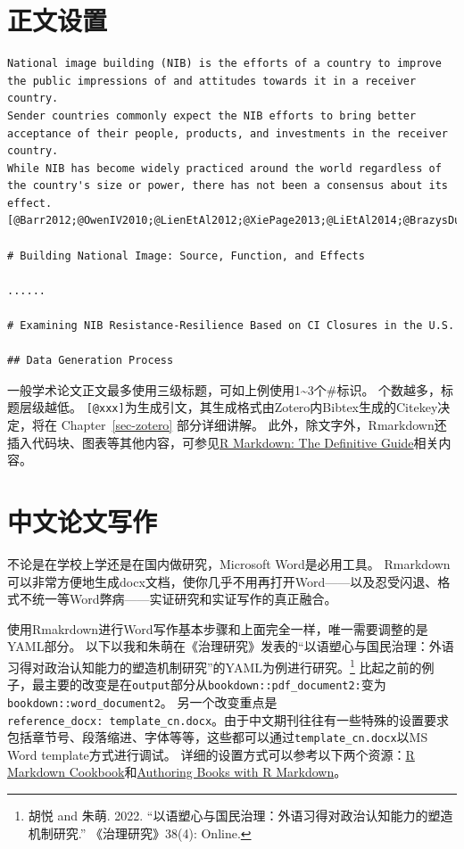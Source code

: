 \documentclass[
  letterpaper,
  DIV=11,
  numbers=noendperiod,
  oneside]{scrreprt}
\begin{document}
\hypertarget{ux6b63ux6587ux8bbeux7f6e}{%
\section{正文设置}\label{ux6b63ux6587ux8bbeux7f6e}}

\begin{verbatim}
National image building (NIB) is the efforts of a country to improve the public impressions of and attitudes towards it in a receiver country.
Sender countries commonly expect the NIB efforts to bring better acceptance of their people, products, and investments in the receiver country. 
While NIB has become widely practiced around the world regardless of the country's size or power, there has not been a consensus about its effect. [@Barr2012;@OwenIV2010;@LienEtAl2012;@XiePage2013;@LiEtAl2014;@BrazysDukalskis2019b;@Meng2020]......

# Building National Image: Source, Function, and Effects

......

# Examining NIB Resistance-Resilience Based on CI Closures in the U.S. 

## Data Generation Process
\end{verbatim}

一般学术论文正文最多使用三级标题，可如上例使用1\textasciitilde3个\#标识。
个数越多，标题层级越低。
\texttt{{[}@xxx{]}}为生成引文，其生成格式由Zotero内Bibtex生成的Citekey决定，将在
Chapter~\ref{sec-zotero} 部分详细讲解。
此外，除文字外，Rmarkdown还插入代码块、图表等其他内容，可参见\href{https://bookdown.org/yihui/rmarkdown/r-code.html}{R
Markdown: The Definitive Guide}相关内容。

\hypertarget{ux4e2dux6587ux8bbaux6587ux5199ux4f5c}{%
\section{中文论文写作}\label{ux4e2dux6587ux8bbaux6587ux5199ux4f5c}}

不论是在学校上学还是在国内做研究，Microsoft Word是必用工具。
Rmarkdown可以非常方便地生成docx文档，使你几乎不用再打开Word------以及忍受闪退、格式不统一等Word弊病------实证研究和实证写作的真正融合。

使用Rmakrdown进行Word写作基本步骤和上面完全一样，唯一需要调整的是YAML部分。
以下以我和朱萌在《治理研究》发表的``以语塑心与国民治理：外语习得对政治认知能力的塑造机制研究''的YAML为例进行研究。\footnote{胡悦
  and 朱萌. 2022.
  ``以语塑心与国民治理：外语习得对政治认知能力的塑造机制研究.''
  《治理研究》38(4): Online.}
比起之前的例子，最主要的改变是在\texttt{output}部分从\texttt{bookdown::pdf\_document2:}变为\texttt{bookdown::word\_document2}。
另一个改变重点是\texttt{reference\_docx:\ template\_cn.docx}。由于中文期刊往往有一些特殊的设置要求包括章节号、段落缩进、字体等等，这些都可以通过\texttt{template\_cn.docx}以MS
Word template方式进行调试。
详细的设置方式可以参考以下两个资源：\href{https://bookdown.org/yihui/rmarkdown-cookbook/word-template.html}{R
Markdown
Cookbook}和\href{https://bookdown.org/yihui/bookdown/internationalization.html}{Authoring
Books with R Markdown}。
\end{document}
